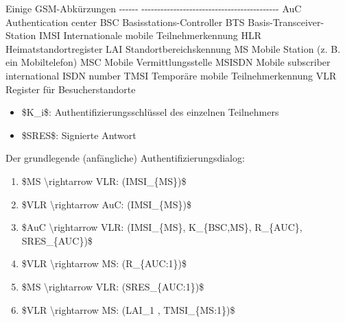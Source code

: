 \documentclass[a4paper]{article}
\begin{document}
\begin{multicols}{3}
    Einige GSM-Abkürzungen \textbar{} \textbar{} \textbar{} \textbar{}
    -\/-\/-\/-\/-\/- \textbar{}
    -\/-\/-\/-\/-\/-\/-\/-\/-\/-\/-\/-\/-\/-\/-\/-\/-\/-\/-\/-\/-\/-\/-\/-\/-\/-\/-\/-\/-\/-\/-\/-\/-\/-\/-\/-\/-\/-\/-\/-\/-\/-\/-
    \textbar{} \textbar{} AuC \textbar{} Authentication center \textbar{}
    \textbar{} BSC \textbar{} Basisstations-Controller \textbar{} \textbar{}
    BTS \textbar{} Basis-Transceiver-Station \textbar{} \textbar{} IMSI
    \textbar{} Internationale mobile Teilnehmerkennung \textbar{} \textbar{}
    HLR \textbar{} Heimatstandortregister \textbar{} \textbar{} LAI
    \textbar{} Standortbereichskennung \textbar{} \textbar{} MS \textbar{}
    Mobile Station (z. B. ein Mobiltelefon) \textbar{} \textbar{} MSC
    \textbar{} Mobile Vermittlungsstelle \textbar{} \textbar{} MSISDN
    \textbar{} Mobile subscriber international ISDN number \textbar{}
    \textbar{} TMSI \textbar{} Temporäre mobile Teilnehmerkennung \textbar{}
    \textbar{} VLR \textbar{} Register für Besucherstandorte \textbar{}



    \begin{itemize}
        \item
              \$K\_i\$: Authentifizierungsschlüssel des einzelnen Teilnehmers
        \item
              \$SRES\$: Signierte Antwort
    \end{itemize}

    Der grundlegende (anfängliche) Authentifizierungsdialog:

    \begin{enumerate}
        \def\labelenumi{\arabic{enumi}.}
        \item
              \$MS \textbackslash rightarrow VLR: (IMSI\_\{MS\})\$
        \item
              \$VLR \textbackslash rightarrow AuC: (IMSI\_\{MS\})\$
        \item
              \$AuC \textbackslash rightarrow VLR: (IMSI\_\{MS\}, K\_\{BSC,MS\},
              R\_\{AUC\}, SRES\_\{AUC\})\$
        \item
              \$VLR \textbackslash rightarrow MS: (R\_\{AUC:1\})\$
        \item
              \$MS \textbackslash rightarrow VLR: (SRES\_\{AUC:1\})\$
        \item
              \$VLR \textbackslash rightarrow MS: (LAI\_1 , TMSI\_\{MS:1\})\$
    \end{enumerate}


\end{multicols}
\end{document}
